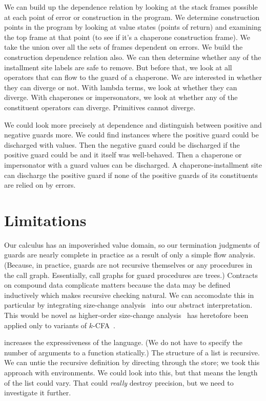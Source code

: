 \documentclass{sigplanconf}
\begin{document}
We can build up the dependence relation by looking at the stack frames possible at each point of error or construction in the program.
We determine construction points in the program by looking at value states (points of return) and examining the top frame at that point (to see if it's a chaperone construction frame).
We take the union over all the sets of frames dependent on errors.
We build the construction dependence relation also.
We can then determine whether any of the installment site labels are safe to remove.
But before that, we look at all operators that can flow to the guard of a chaperone.
We are interested in whether they can diverge or not.
With lambda terms, we look at whether they can diverge.
With chaperones or impersonators, we look at whether any of the constituent operators can diverge.
Primitives cannot diverge.

We could look more precisely at dependence and distinguish between positive and negative guards more.
We could find instances where the positive guard could be discharged with values. Then the negative guard could be discharged if the positive guard could be and it itself was well-behaved.
Then a chaperone or impersonator with a guard values can be discharged.
A chaperone-installment site can discharge the positive guard if none of the positive guards of its constituents are relied on by errors.



\section{Limitations}

Our calculus has an impoverished value domain, so our termination judgments of guards are nearly complete in practice as a result of only a simple flow analysis.
(Because, in practice, guards are not recursive themselves or any procedures in the call graph. Essentially, call graphs for guard procedures are trees.)
Contracts on compound data complicate matters because the data may be defined inductively which makes recursive checking natural.
We can accomodate this in particular by integrating size-change analysis~\cite{lee2001size} into our abstract interpretation.
This would be novel as higher-order size-change analysis~\cite{sereni2007termination} has heretofore been applied only to variants of $k$-CFA~\cite{shivers1991control}.

 increases the expressiveness of the language.
(We do not have to specify the number of arguments to a function statically.)
The structure of a list is recursive.
We can untie the recursive definition by directing through the store; we took this approach with environments.
We could look into this, but that means the length of the list could vary.
That could \emph{really} destroy precision, but we need to investigate it further.
\end{document}
